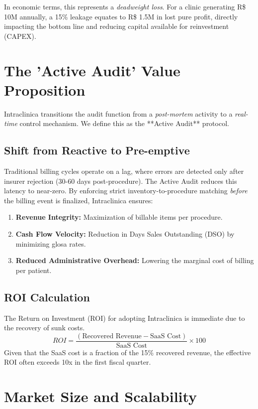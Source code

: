 \documentclass[12pt, openright, twoside, a4paper, english, french, spanish]{abntex2}
\begin{document}
In economic terms, this represents a \textit{deadweight loss}. For a clinic generating R\$ 10M annually, a 15\% leakage equates to R\$ 1.5M in lost pure profit, directly impacting the bottom line and reducing capital available for reinvestment (CAPEX).

\section{The 'Active Audit' Value Proposition}

Intraclinica transitions the audit function from a \textit{post-mortem} activity to a \textit{real-time} control mechanism. We define this as the **Active Audit** protocol.

\subsection{Shift from Reactive to Pre-emptive}
Traditional billing cycles operate on a lag, where errors are detected only after insurer rejection (30-60 days post-procedure). The Active Audit reduces this latency to near-zero. By enforcing strict inventory-to-procedure matching \textit{before} the billing event is finalized, Intraclinica ensures:

\begin{enumerate}
    \item \textbf{Revenue Integrity:} Maximization of billable items per procedure.
    \item \textbf{Cash Flow Velocity:} Reduction in Days Sales Outstanding (DSO) by minimizing glosa rates.
    \item \textbf{Reduced Administrative Overhead:} Lowering the marginal cost of billing per patient.
\end{enumerate}

\subsection{ROI Calculation}
The Return on Investment (ROI) for adopting Intraclinica is immediate due to the recovery of sunk costs.
\[
ROI = \frac{(\text{Recovered Revenue} - \text{SaaS Cost})}{\text{SaaS Cost}} \times 100
\]
Given that the SaaS cost is a fraction of the 15\% recovered revenue, the effective ROI often exceeds 10x in the first fiscal quarter.

\section{Market Size and Scalability}
\end{document}
